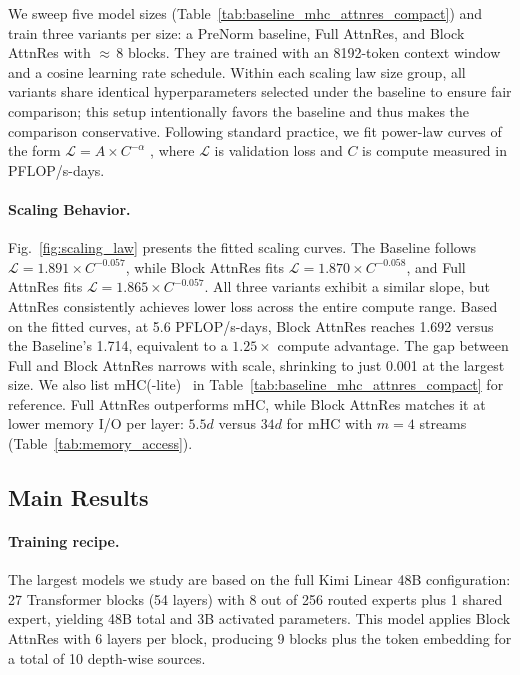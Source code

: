

We sweep five model sizes (Table~\ref{tab:baseline_mhc_attnres_compact}) and train three variants per size: a PreNorm baseline, Full AttnRes, and Block AttnRes with ${\approx}\,8$ blocks.
They are trained with an 8192-token context window and a cosine learning rate schedule.
Within each scaling law size group, all variants share identical hyperparameters selected under the baseline to ensure fair comparison; this setup intentionally favors the baseline and thus makes the comparison conservative. Following standard practice, we fit power-law curves of the form $\mathcal{L} = A \times C^{-\alpha}$ \cite{kaplan2020scalinglawsneurallanguage,hoffmann2022trainingcomputeoptimallargelanguage}, where $\mathcal{L}$ is validation loss and $C$ is compute measured in PFLOP/s-days.

\paragraph{Scaling Behavior.}
Fig.~\ref{fig:scaling_law} presents the fitted scaling curves. The Baseline follows $\mathcal{L} = 1.891 \times C^{-0.057}$, while Block AttnRes fits $\mathcal{L} = 1.870 \times C^{-0.058}$, and Full AttnRes fits $\mathcal{L} = 1.865 \times C^{-0.057}$. All three variants exhibit a similar slope, but AttnRes consistently achieves lower loss across the entire compute range. Based on the fitted curves, at 5.6 PFLOP/s-days, Block AttnRes reaches 1.692 versus the Baseline's 1.714, equivalent to a $1.25\times$ compute advantage. The gap between Full and Block AttnRes narrows with scale, shrinking to just 0.001 at the largest size.
We also list mHC(-lite)~\cite{yang2026mhclite} in Table~\ref{tab:baseline_mhc_attnres_compact} for reference. Full AttnRes outperforms mHC, while Block AttnRes matches it at lower memory I/O per layer: $5.5d$ versus $34d$ for mHC with $m{=}4$ streams (Table~\ref{tab:memory_access}).


\subsection{Main Results}
\paragraph{Training recipe.}
The largest models we study are based on the full Kimi Linear 48B configuration: 27 Transformer blocks (54 layers) with 8 out of 256 routed experts plus 1 shared expert, yielding 48B total and 3B activated parameters.
This model applies Block AttnRes with 6 layers per block, producing 9 blocks plus the token embedding for a total of 10 depth-wise sources.

